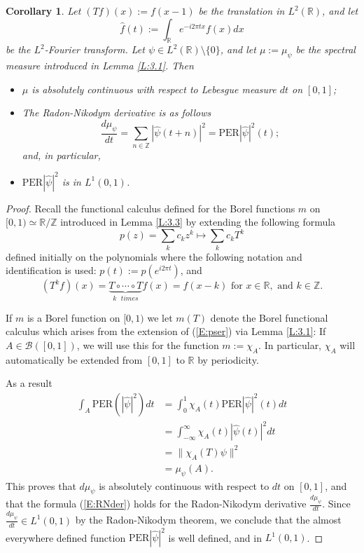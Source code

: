 \documentclass{birkmult}
\newtheorem{cor}[thm]{Corollary}
\theoremstyle{definition}
\theoremstyle{remark}
\numberwithin{equation}{section}
\begin{document}
\begin{cor}
\label{C:Tf}
Let $(Tf)(x):=f(x-1)$ be the translation in $L^{2}(\mathbb{R})$, and let
\begin{equation}
\label{E:fFF}
  \widehat{f}(t):=\int_{\mathbb{R}}e^{-i2\pi tx}f(x)dx
\end{equation}
be the $L^{2}$-Fourier transform.
Let $\psi \in L^{2}(\mathbb{R}) \setminus \{0\}$, and let $\mu := \mu_{\psi}$
be the spectral measure introduced in Lemma \ref{L:3.1}.  Then
\begin{itemize}
  \item[(i)] $\mu$ is absolutely continuous with respect to Lebesgue 
    measure $dt$ on $[0,1]$;
  \item[(ii)] The Radon-Nikodym derivative is as follows
    \begin{equation}
    \label{E:RNder}
      \frac{d\mu_{\psi}}{dt} = \sum_{n \in \mathbb{Z}}|\widehat{\psi}(t+n)|^{2}
      = \text{PER}|\widehat{\psi}|^{2}(t);
    \end{equation}
  and, in particular,
  \item[(iii)] $\text{PER}|\widehat{\psi}|^{2}$ is in $L^{1}(0,1)$. 
\end{itemize}
\end{cor}
\begin{proof}
Recall the functional calculus defined for the Borel functions $m$ on 
$[0,1) \simeq \mathbb{R}/\mathbb{Z}$ introduced in Lemma \ref{L:3.3} by
extending the following formula
\begin{equation}
\label{E:pser}
  p(z)=\sum_{k}c_{k}z^{k} \mapsto \sum_{k}c_{k}T^{k}
\end{equation}
defined initially on the polynomials where the following notation and 
identification is used: $p(t):=p(e^{i2\pi t})$, and 
\[
  (T^{k}f)(x) = \underbrace{T \circ \cdots \circ T}_{k \text{ } times}f(x)
              = f(x-k) \text{ for } x \in \mathbb{R}, \text{ and }
              k \in \mathbb{Z}.
\]

If $m$ is a Borel function on $[0,1)$ we let $m(T)$ denote the Borel 
functional calculus which arises from the extension of (\ref{E:pser})
via Lemma \ref{L:3.1}: If $A \in \mathcal{B}([0,1])$, we will use this
for the function $m:=\chi_{A}$.  In particular,  $\chi_{A}$ will 
automatically be extended from $[0,1]$ to $\mathbb{R}$ by periodicity.

As a result 
\begin{align*}
  \int_{A} \text{PER}(|\widehat{\psi}|^{2})dt 
  &= \int_{0}^{1}\chi_{A}(t) \text{PER}|\widehat{\psi}|^{2}(t)dt \\
  &= \int_{-\infty}^{\infty}\chi_{A}(t) |\widehat{\psi}(t)|^{2}dt \\
  &= \|\chi_{A}(T)\psi\|^{2} \\
  &= \mu_{\psi}(A).  
\end{align*}
This proves that $d\mu_{\psi}$ is absolutely continuous with respect to 
$dt$ on $[0,1]$, and that the formula (\ref{E:RNder}) holds for the 
Radon-Nikodym derivative $\frac{d\mu_{\psi}}{dt}$.  Since 
$\frac{d\mu_{\psi}}{dt} \in L^{1}(0,1)$ by the Radon-Nikodym theorem, we 
conclude that the almost everywhere defined function 
$\text{PER}|\widehat{\psi}|^{2}$ is well defined, and in $L^{1}(0,1)$.
\end{proof}
\end{document}
